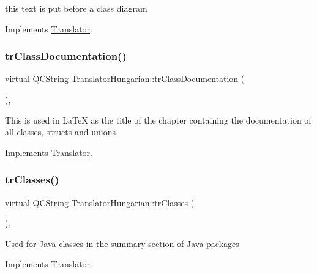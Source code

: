 this text is put before a class diagram 

Implements \mbox{\hyperlink{class_translator}{Translator}}.

\mbox{\label{class_translator_hungarian_aed3247411254defaf3b5a05693ca303b}} 
\subsubsection{\texorpdfstring{trClassDocumentation()}{trClassDocumentation()}}
{\footnotesize\ttfamily virtual \mbox{\hyperlink{class_q_c_string}{Q\+C\+String}} Translator\+Hungarian\+::tr\+Class\+Documentation (\begin{DoxyParamCaption}{ }\end{DoxyParamCaption})\hspace{0.3cm}{\ttfamily [inline]}, {\ttfamily [virtual]}}

This is used in La\+TeX as the title of the chapter containing the documentation of all classes, structs and unions. 

Implements \mbox{\hyperlink{class_translator}{Translator}}.

\mbox{\label{class_translator_hungarian_af253d6545ecd4ec82e92d4dec8577716}} 
\subsubsection{\texorpdfstring{trClasses()}{trClasses()}}
{\footnotesize\ttfamily virtual \mbox{\hyperlink{class_q_c_string}{Q\+C\+String}} Translator\+Hungarian\+::tr\+Classes (\begin{DoxyParamCaption}{ }\end{DoxyParamCaption})\hspace{0.3cm}{\ttfamily [inline]}, {\ttfamily [virtual]}}

Used for Java classes in the summary section of Java packages 

Implements \mbox{\hyperlink{class_translator}{Translator}}.

\mbox{\label{class_translator_hungarian_aaa48735eb05cccfb79612a469b8b9c4c}} 
